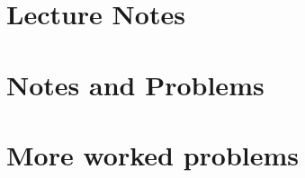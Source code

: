 \part{Lecture Notes}
   

\part{Notes and Problems}
   
   
   
   
   
   
   
   
   
   
   
   
   

%      

\part{More worked problems}
   
   
   
   
   
   
   


